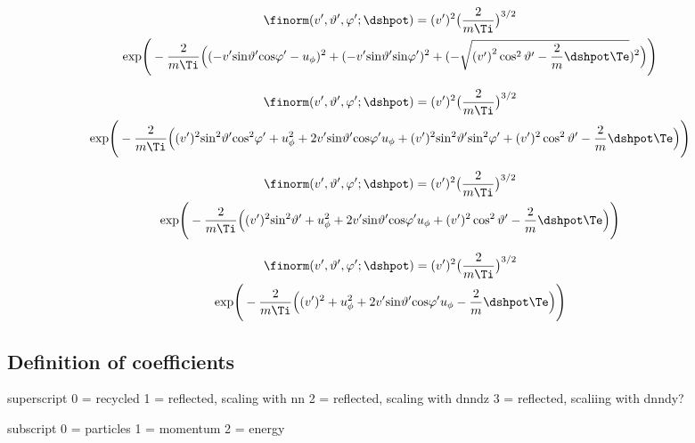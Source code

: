 \begin{multline}
 \finorm(v',\vartheta',\varphi';\dshpot)  = (v')^{2} \big( \frac{2}{m \Ti}\big)^{3/2} \\
 \mathrm{exp} \Bigg( - \frac{2}{m \Ti} \Big( (-v' \mathrm{sin} \vartheta' \mathrm{cos} \varphi' - u_\phi )^2 + (-v' \mathrm{sin} \vartheta' \mathrm{sin} \varphi')^2 + (-\sqrt{\left (v'\right )^{2} \cos^{2} \vartheta' -\frac{2}{m} \dshpot \Te})^2 \Big)\Bigg)
\label{eq:temp4}
\end{multline}

\begin{multline}
 \finorm(v',\vartheta',\varphi';\dshpot)  = (v')^{2} \big( \frac{2}{m \Ti}\big)^{3/2} \\
 \mathrm{exp} \Bigg( - \frac{2}{m \Ti} \Big( (v')^2 \mathrm{sin}^2 \vartheta' \mathrm{cos}^2 \varphi' + u_\phi^2 + 2 v' \mathrm{sin} \vartheta' \mathrm{cos} \varphi' u_\phi  + (v')^2 \mathrm{sin}^2 \vartheta' \mathrm{sin}^2 \varphi' +  (v')^{2} \cos^{2} \vartheta' -\frac{2}{m} \dshpot \Te \Big)\Bigg)
\label{eq:temp5}
\end{multline}

\begin{multline}
 \finorm(v',\vartheta',\varphi';\dshpot)  = (v')^{2} \big( \frac{2}{m \Ti}\big)^{3/2} \\
 \mathrm{exp} \Bigg( - \frac{2}{m \Ti} \Big( (v')^2 \mathrm{sin}^2 \vartheta' + u_\phi^2 + 2 v' \mathrm{sin} \vartheta' \mathrm{cos} \varphi' u_\phi  +  (v')^{2} \cos^{2} \vartheta' -\frac{2}{m} \dshpot \Te \Big)\Bigg)
\label{eq:temp6}
\end{multline}

\begin{multline}
 \finorm(v',\vartheta',\varphi';\dshpot)  = (v')^{2} \big( \frac{2}{m \Ti}\big)^{3/2} \\
 \mathrm{exp} \Bigg( - \frac{2}{m \Ti} \Big( (v')^2  + u_\phi^2 + 2 v' \mathrm{sin} \vartheta' \mathrm{cos} \varphi' u_\phi  -\frac{2}{m} \dshpot \Te \Big)\Bigg)
\label{eq:temp7}
\end{multline}

\subsection{Definition of coefficients}
superscript
0 = recycled
1 = reflected, scaling with nn
2 = reflected, scaling with dnndz
3 = reflected, scaliing with dnndy?

subscript
0 = particles
1 = momentum
2 = energy

